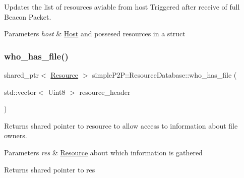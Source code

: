 Updates the list of resources aviable from host Triggered after receive of full Beacon Packet. 


\begin{DoxyParams}{Parameters}
{\em host} & \hyperlink{classsimpleP2P_1_1Host}{Host} and possesed resources in a struct \\
\hline
\end{DoxyParams}
\mbox{\label{classsimpleP2P_1_1ResourceDatabase_a32c5a7b08405cbef80010f8ec1119f58}} 
\subsubsection{\texorpdfstring{who\+\_\+has\+\_\+file()}{who\_has\_file()}\hspace{0.1cm}{\footnotesize\ttfamily [1/2]}}
{\footnotesize\ttfamily shared\+\_\+ptr$<$ \hyperlink{classsimpleP2P_1_1Resource}{Resource} $>$ simple\+P2\+P\+::\+Resource\+Database\+::who\+\_\+has\+\_\+file (\begin{DoxyParamCaption}\item[{std\+::vector$<$ Uint8 $>$}]{resource\+\_\+header }\end{DoxyParamCaption})\hspace{0.3cm}{\ttfamily [inline]}}



Returns shared pointer to resource to allow access to information about file owners. 


\begin{DoxyParams}{Parameters}
{\em res} & \hyperlink{classsimpleP2P_1_1Resource}{Resource} about which information is gathered \\
\hline
\end{DoxyParams}
\begin{DoxyReturn}{Returns}
shared pointer to res 
\end{DoxyReturn}
\mbox{\label{classsimpleP2P_1_1ResourceDatabase_a1148b6d172d74970c2208d24aac4db3e}} 
